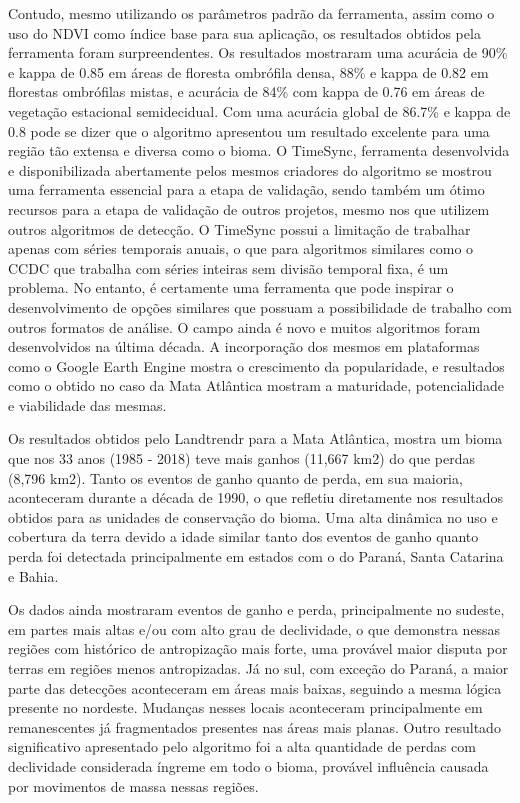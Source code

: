Contudo, mesmo utilizando os parâmetros padrão da ferramenta, assim como o uso do NDVI como índice base para sua aplicação, os resultados obtidos pela ferramenta foram surpreendentes. Os resultados mostraram uma acurácia de 90\% e kappa de 0.85 em áreas de floresta ombrófila densa,  88\% e kappa de 0.82 em florestas ombrófilas mistas, e acurácia de 84\% com kappa de 0.76 em áreas de vegetação estacional semidecidual. Com uma acurácia global de 86.7\% e kappa de 0.8 pode se dizer que o algoritmo apresentou um resultado excelente para uma região tão extensa e diversa como o bioma. O TimeSync, ferramenta desenvolvida e disponibilizada abertamente pelos mesmos criadores do algoritmo se mostrou uma ferramenta essencial para a etapa de validação, sendo também um ótimo recursos para a etapa de validação de outros projetos, mesmo nos que utilizem outros algoritmos de detecção. O TimeSync possui a limitação de trabalhar apenas com séries temporais anuais, o que para algoritmos similares como o CCDC que trabalha com séries inteiras sem divisão temporal fixa, é um problema. No entanto, é certamente uma ferramenta que pode inspirar o desenvolvimento de opções similares que possuam a possibilidade de trabalho com outros formatos de análise. O campo ainda é novo e muitos algoritmos foram desenvolvidos na última década. A incorporação dos mesmos em plataformas como o Google Earth Engine mostra o crescimento da popularidade, e resultados como o obtido no caso da Mata Atlântica mostram a maturidade, potencialidade e viabilidade das mesmas. 

Os resultados obtidos pelo Landtrendr para a Mata Atlântica, mostra um bioma que nos 33 anos (1985 - 2018) teve mais ganhos (11,667 km2) do que perdas (8,796 km2). Tanto os eventos de ganho quanto de perda, em sua maioria, aconteceram durante a década de 1990, o que refletiu diretamente nos resultados obtidos para as unidades de conservação do bioma. Uma alta dinâmica no uso e cobertura da terra devido a idade similar tanto dos eventos de ganho quanto perda foi detectada principalmente em estados com o do Paraná, Santa Catarina e Bahia. 

Os dados ainda mostraram eventos de ganho e perda, principalmente no sudeste, em partes mais altas e/ou com alto grau de declividade, o que demonstra nessas regiões com histórico de antropização mais forte, uma provável maior disputa por terras em regiões menos antropizadas. Já no sul, com exceção do Paraná, a maior parte das detecções aconteceram em áreas mais baixas, seguindo a mesma lógica presente no nordeste. Mudanças nesses locais aconteceram principalmente em remanescentes já fragmentados presentes nas áreas mais planas. Outro resultado significativo apresentado pelo algoritmo foi a alta quantidade de perdas com declividade considerada íngreme em todo o bioma, provável influência causada por movimentos de massa nessas regiões. 

